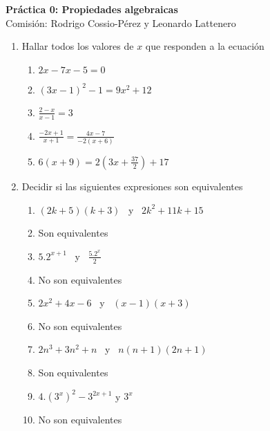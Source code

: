 \documentclass[a4paper]{article}
\newcommand{\answer}{\item[**]}
\newcommand{\exercise}{\item}
\begin{document}
\noindent \hrulefill 
\vspace{-7pt}
\begin{center} 
	\textbf{ Práctica 0: Propiedades algebraicas} \\
	Comisión: Rodrigo Cossio-Pérez y Leonardo Lattenero
\end{center}
\vspace{-10pt}
\hrulefill


\begin{enumerate}

	\exercise Hallar todos los valores de $x$ que responden a la ecuación
	\begin{enumerate} [label=(\alph*)]
		\item $2x-7x-5=0$
		
		\item $(3x-1)^2-1=9x^2+12$

		\item $\displaystyle\frac{2-x}{x-1}=3$

		\item $\displaystyle\frac{-2x+1}{x+1}=\displaystyle\frac{4x-7}{-2(x+6)}$

		\item $6(x+9)=2\left(3x+\displaystyle\frac{37}{2}\right)+17$
	
	\end{enumerate}

	\exercise Decidir si las siguientes expresiones son equivalentes
	\begin{enumerate} [label=(\alph*)]
		\item $(2k+5)(k+3)$ ~y~ $2k^2+11k+15$
		\answer Son equivalentes

		\item $5.2^{x+1}$ ~y~ $\displaystyle\frac{5.2^{x}}{2}$
		\answer No son equivalentes
		
		\item $2x^2+4x-6$ ~y~ $(x-1)(x+3)$
		\answer No son equivalentes

		\item $2n^3+3n^2+n$ ~y~ $n(n+1)(2n+1)$
		\answer Son equivalentes

		\item $4.\left(3^{x}\right)^{2}-3^{2x+1}$ y $3^x$
		\answer No son equivalentes

	\end{enumerate}


\end{enumerate}
\end{document}
